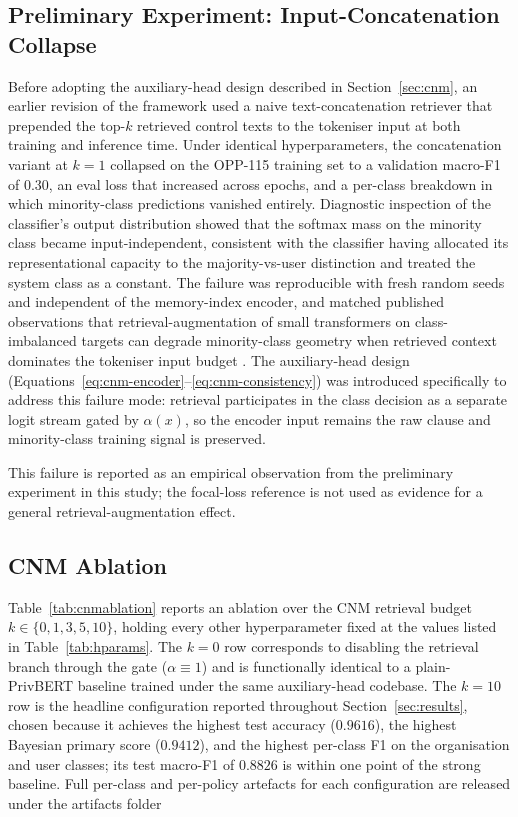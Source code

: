 \documentclass[final,3p,times,twocolumn]{elsarticle}
\begin{document}
	\subsection{Preliminary Experiment: Input-Concatenation Collapse}
	\label{sec:cnm-preliminary} Before adopting the auxiliary-head design described
	in Section~\ref{sec:cnm}, an earlier revision of the framework used a naive
	text-concatenation retriever that prepended the top-$k$ retrieved control
	texts to the tokeniser input at both training and inference time. Under identical
	hyperparameters, the concatenation variant at $k = 1$ collapsed on the OPP-115
	training set to a validation macro-F1 of $0.30$, an eval loss that increased across
	epochs, and a per-class breakdown in which minority-class predictions vanished
	entirely. Diagnostic inspection of the classifier's output distribution showed
	that the softmax mass on the minority class became input-independent,
	consistent with the classifier having allocated its representational capacity
	to the majority-vs-user distinction and treated the system class as a constant.
	The failure was reproducible with fresh random seeds and independent of the memory-index
	encoder, and matched published observations that retrieval-augmentation of
	small transformers on class-imbalanced targets can degrade minority-class
	geometry when retrieved context dominates the tokeniser input budget \citep{lin2017focal}.
	The auxiliary-head design (Equations~\ref{eq:cnm-encoder}--\ref{eq:cnm-consistency})
	was introduced specifically to address this failure mode: retrieval
	participates in the class decision as a separate logit stream gated by
	$\alpha(x)$, so the encoder input remains the raw clause and minority-class training
	signal is preserved. 

	This failure is reported as an empirical observation from the preliminary
	experiment in this study; the focal-loss reference is not used as evidence for
	a general retrieval-augmentation effect.
	\subsection{CNM Ablation}
	\label{sec:cnm-ablation} Table~\ref{tab:cnmablation} reports an ablation over the
	CNM retrieval budget $k \in \{0, 1, 3, 5, 10\}$, holding every other
	hyperparameter fixed at the values listed in Table~\ref{tab:hparams}. The $k =
	0$ row corresponds to disabling the retrieval branch through the gate ($\alpha
	\equiv 1$) and is functionally identical to a plain-PrivBERT baseline trained under
	the same auxiliary-head codebase. The $k = 10$ row is the headline
	configuration reported throughout Section~\ref{sec:results}, chosen because it
	achieves the highest test accuracy ($0.9616$), the highest Bayesian primary
	score ($0.9412$), and the highest per-class F1 on the organisation and user classes;
	its test macro-F1 of $0.8826$ is within one point of the strong baseline. Full
	per-class and per-policy artefacts for each configuration are released under the artifacts folder
\end{document}
